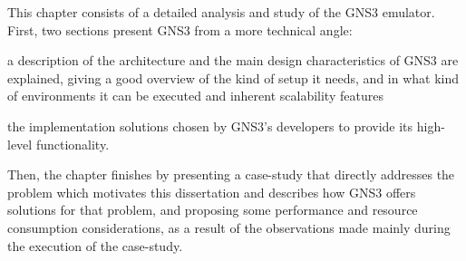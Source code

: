 

This chapter consists of a detailed analysis and study of the GNS3 emulator.
First, two sections present GNS3 from a more technical angle:
  \begin{enumerate*}[label=(\roman*), itemjoin={{, }}, itemjoin*={{, and }}]
  \item a description of the architecture and the main design characteristics of GNS3 are explained, giving a good overview of the kind of setup it needs, and in what kind of environments it can be executed and inherent scalability features
  \item the implementation solutions chosen by GNS3's developers to provide its high-level functionality.
  \end{enumerate*}
Then, the chapter finishes by presenting a case-study that directly addresses the problem which motivates this dissertation and describes how GNS3 offers solutions for that problem, and proposing some performance and resource consumption considerations, as a result of the observations made mainly during the execution of the case-study.







